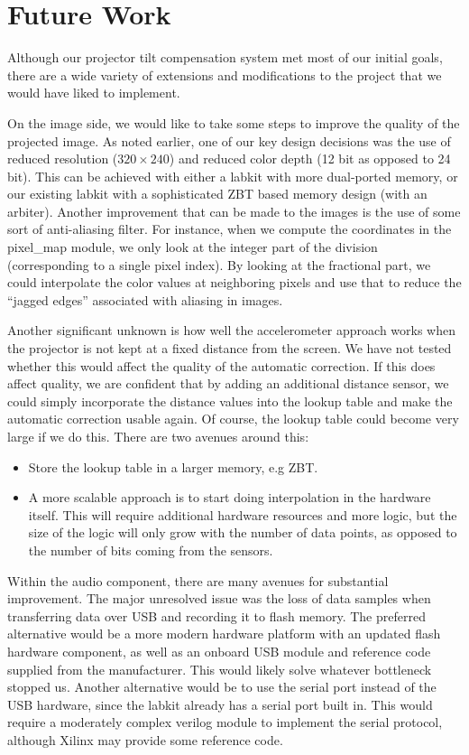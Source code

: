 \documentclass{article}
\begin{document}
\section{Future Work}
Although our projector tilt compensation system met most of our initial goals,
there are a wide variety of extensions and modifications to the project that we would have liked to implement.

On the image side, we would like to take some steps to improve the quality of the projected image.
As noted earlier, one of our key design decisions was the use of reduced resolution ($320 \times 240$) and reduced color depth (12 bit as opposed to 24 bit).
This can be achieved with either a labkit with more dual-ported memory, or our existing labkit with a sophisticated ZBT based memory design (with an arbiter).
Another improvement that can be made to the images is the use of some sort of anti-aliasing filter.
For instance, when we compute the coordinates in the pixel\_map module, we only look at the integer part of the division (corresponding to a single pixel index).
By looking at the fractional part, we could interpolate the color values at neighboring pixels and use that to reduce the ``jagged edges'' associated with aliasing in images.

Another significant unknown is how well the accelerometer approach works when the projector is not kept at a fixed distance from the screen.
We have not tested whether this would affect the quality of the automatic correction.
If this does affect quality, we are confident that by adding an additional distance sensor,
we could simply incorporate the distance values into the lookup table and make the automatic correction usable again.
Of course, the lookup table could become very large if we do this.
There are two avenues around this:
\begin{itemize}
    \item Store the lookup table in a larger memory, e.g ZBT.
    \item A more scalable approach is to start doing interpolation in the hardware itself.
        This will require additional hardware resources and more logic,
        but the size of the logic will only grow with the number of data points,
        as opposed to the number of bits coming from the sensors.
\end{itemize}

Within the audio component, there are many avenues for substantial improvement.
The major unresolved issue was the loss of data samples when transferring data over USB and recording it to flash memory.
The preferred alternative would be a more modern hardware platform with an updated flash hardware component,
as well as an onboard USB module and reference code supplied from the manufacturer.
This would likely solve whatever bottleneck stopped us.
Another alternative would be to use the serial port instead of the USB hardware, since the labkit already has a serial port built in.
This would require a moderately complex verilog module to implement the serial protocol, although Xilinx may provide some reference code.
\end{document}
